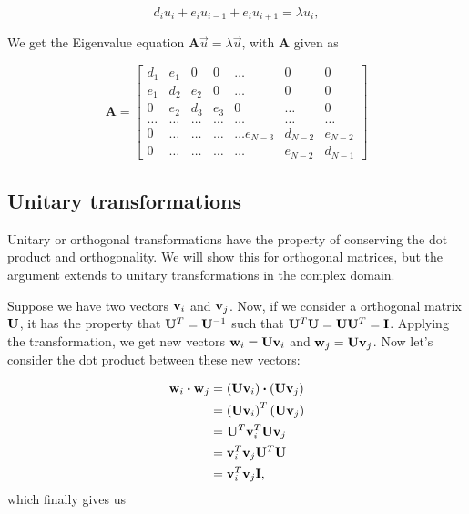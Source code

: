\documentclass{emulateapj}
\begin{document}
\begin{equation}
d_iu_i+e_{i}u_{i-1}+e_{i}u_{i+1}  = \lambda u_i,
\end{equation}

We get the Eigenvalue equation $\mathbf{A}\vec{u} = \lambda \vec{u}$, with $\mathbf{A}$ given as

\begin{equation}
    \mathbf{A} =
    \begin{bmatrix}d_1 & e_1 & 0   & 0    & \dots  &0     & 0 \\
                                e_1 & d_2 & e_2 & 0    & \dots  &0     &0 \\
                                0   & e_2 & d_3 & e_3  &0       &\dots & 0\\
                                \dots  & \dots & \dots & \dots  &\dots      &\dots & \dots\\
                                0   & \dots & \dots & \dots  &\dots  e_{N-3}     &d_{N-2} & e_{N-2}\\
                                0   & \dots & \dots & \dots  &\dots       &e_{N-2} & d_{N-1}
             \end{bmatrix}
      \label{eq:sematrix}
\end{equation}

\subsection{Unitary transformations}
Unitary or orthogonal transformations have the property of conserving the dot product and orthogonality. We will show this for orthogonal matrices, but the argument extends to unitary transformations in the complex domain.

Suppose we have two vectors $\bold{v}_i$ and $\bold{v}_j$. Now, if we consider a orthogonal matrix $\bold{U}$, it has the property that $\bold{U}^T = \bold{U}^{-1}$ such that $\bold{U}^T\bold{U} = \bold{U}\bold{U}^T = \bold{I}$. Applying the transformation, we get new vectors $\bold{w}_i = \bold{U}\bold{v}_i$ and $ \bold{w}_j = \bold{U}\bold{v}_j$.
Now let's consider the dot product between these new vectors:

\begin{align*}
	\bold{w}_i \boldsymbol{\cdot} \bold{w}_j &= \left(\bold{U}\bold{v}_i\right) \boldsymbol{\cdot} \left(\bold{U}\bold{v}_j\right) \\
	&= \left(\bold{U}\bold{v}_i\right)^T \left(\bold{U}\bold{v}_j\right) \\
	&= \bold{U}^T \bold{v}_i^T \bold{U}\bold{v}_j \\
	&= \bold{v}_i^T  \bold{v}_j \bold{U}^T \bold{U} \\
	&= \bold{v}_i^T  \bold{v}_j \bold{I},
\end{align*}
which finally gives us
\end{document}
